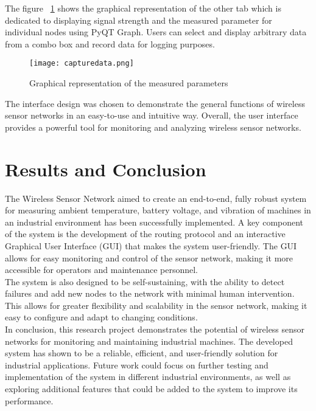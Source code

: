 \documentclass[conference]{IEEEtran}
\begin{document}
The figure ~\ref{fig:Graphical representation of the measured parameters} shows the graphical representation of the other tab which is dedicated to displaying signal strength and the measured parameter for individual nodes using PyQT Graph. Users can select and display arbitrary data from a combo box and record data for logging purposes.

\begin{figure}
  \texttt{[image: capturedata.png]}
  \caption{Graphical representation of the measured parameters}
  \label{fig:Graphical representation of the measured parameters}
\end{figure}

The interface design was chosen to demonstrate the general functions of wireless sensor networks in an easy-to-use and intuitive way. Overall, the user interface provides a powerful tool for monitoring and analyzing wireless sensor networks.

\section{Results and Conclusion}
The Wireless Sensor Network aimed to create an end-to-end, fully robust system for measuring ambient temperature, battery voltage, and vibration of machines in an industrial environment has been successfully implemented. A key component of the system is the development of the routing protocol and an interactive Graphical User Interface (GUI) that makes the system user-friendly. The GUI allows for easy monitoring and control of the sensor network, making it more accessible for operators and maintenance personnel.\\
The system is also designed to be self-sustaining, with the ability to detect failures and add new nodes to the network with minimal human intervention. This allows for greater flexibility and scalability in the sensor network, making it easy to configure and adapt to changing conditions.\\
In conclusion, this research project demonstrates the potential of wireless sensor networks for monitoring and maintaining industrial machines. The developed system has shown to be a reliable, efficient, and user-friendly solution for industrial applications. Future work could focus on further testing and implementation of the system in different industrial environments, as well as exploring additional features that could be added to the system to improve its performance.
\end{document}
